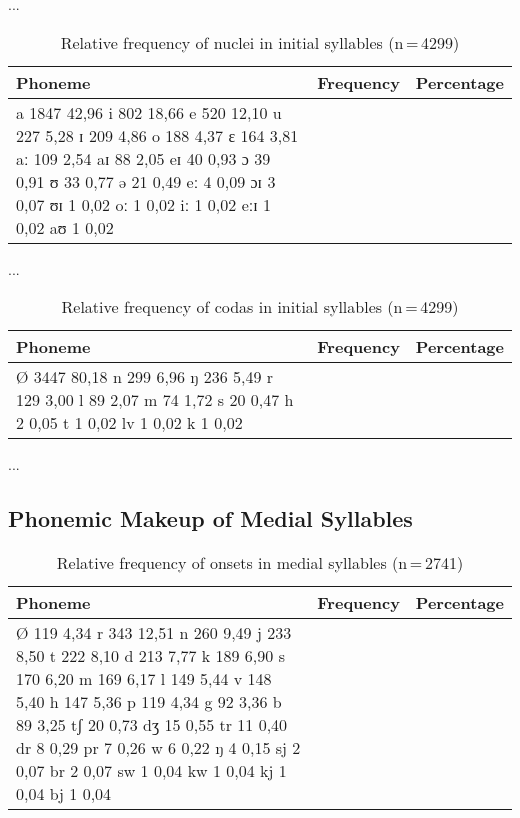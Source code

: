 ...

\begin{table}[hp]\centering
\caption[Relative frequency of nuclei in initial syllables]{Relative frequency of nuclei in initial syllables (n\,=\,4299)}
\begin{tabu} to 0.5\textwidth{X X[c] X[c]}
\tableheaderfont\toprule
Phoneme
	& Frequency
	& Percentage
	\\
	
\toprule

a	1847	42,96%
i	802	18,66%
e	520	12,10%
u	227	5,28%
ɪ	209	4,86%
o	188	4,37%
ɛ	164	3,81%
aː	109	2,54%
aɪ	88	2,05%
eɪ	40	0,93%
ɔ	39	0,91%
ʊ	33	0,77%
ə	21	0,49%
eː	4	0,09%
ɔɪ	3	0,07%
ʊɪ	1	0,02%
oː	1	0,02%
iː	1	0,02%
eːɪ	1	0,02%
aʊ	1	0,02%

\bottomrule
\end{tabu}
\label{tab:initnuc}
\end{table}

...

\begin{table}[hp]\centering
\caption[Relative frequency of codas in initial syllables]{Relative frequency of codas in initial syllables (n\,=\,4299)}
\begin{tabu} to 0.5\textwidth{X X[c] X[c]}
\tableheaderfont\toprule
Phoneme
	& Frequency
	& Percentage
	\\
	
\toprule

Ø	3447	80,18%
n	299	6,96%
ŋ	236	5,49%
r	129	3,00%
l	89	2,07%
m	74	1,72%
s	20	0,47%
h	2	0,05%
t	1	0,02%
lv	1	0,02%
k	1	0,02%

\bottomrule
\end{tabu}
\label{tab:initcod}
\end{table}

...


\subsection{Phonemic Makeup of Medial Syllables}

\begin{table}[hp]\centering
\caption[Relative frequency of onsets in medial syllables]{Relative frequency of onsets in medial syllables (n\,=\,2741)}
\begin{tabu} to 0.5\textwidth{X X[c] X[c]}
\tableheaderfont\toprule
Phoneme
	& Frequency
	& Percentage
	\\
	
\toprule

Ø	119	4,34%
r	343	12,51%
n	260	9,49%
j	233	8,50%
t	222	8,10%
d	213	7,77%
k	189	6,90%
s	170	6,20%
m	169	6,17%
l	149	5,44%
v	148	5,40%
h	147	5,36%
p	119	4,34%
g	92	3,36%
b	89	3,25%
tʃ	20	0,73%
dʒ	15	0,55%
tr	11	0,40%
dr	8	0,29%
pr	7	0,26%
w	6	0,22%
ŋ	4	0,15%
sj	2	0,07%
br	2	0,07%
sw	1	0,04%
kw	1	0,04%
kj	1	0,04%
bj	1	0,04%

\bottomrule
\end{tabu}
\label{tab:midon}
\end{table}


